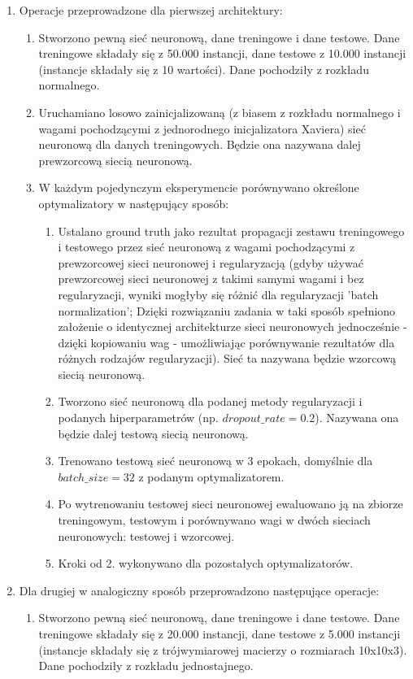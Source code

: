 \documentclass[12pt]{article}
\begin{document}
\begin{enumerate}
	\item Operacje przeprowadzone dla pierwszej architektury:
	\begin{enumerate}
		\item Stworzono pewną sieć neuronową, dane treningowe i dane testowe. Dane treningowe składały się z 50.000 instancji, dane testowe z 10.000 instancji (instancje składały się z 10 wartości). Dane pochodziły z rozkładu normalnego.
		\item Uruchamiano losowo zainicjalizowaną (z biasem z rozkładu normalnego i wagami pochodzącymi z jednorodnego inicjalizatora Xaviera) sieć neuronową dla danych treningowych. Będzie ona nazywana dalej prewzorcową siecią neuronową.
		\item W każdym pojedynczym eksperymencie porównywano określone optymalizatory w następujący sposób:
		\begin{enumerate}
			\item Ustalano ground truth jako rezultat propagacji zestawu treningowego i testowego przez sieć neuronową z wagami pochodzącymi z prewzorcowej sieci neuronowej i regularyzacją (gdyby używać prewzorcowej sieci neuronowej z takimi samymi wagami i bez regularyzacji, wyniki mogłyby się różnić dla regularyzacji 'batch  normalization'; Dzięki rozwiązaniu zadania w taki sposób spełniono założenie o identycznej architekturze sieci neuronowych jednocześnie - dzięki kopiowaniu wag - umożliwiając porównywanie rezultatów dla różnych rodzajów regularyzacji). Sieć ta nazywana będzie wzorcową siecią neuronową.
			\item Tworzono sieć neuronową dla podanej metody regularyzacji i podanych hiperparametrów (np. $dropout\_rate=0.2$). Nazywana ona będzie dalej testową siecią neuronową.
			\item Trenowano testową sieć neuronową w 3 epokach, domyślnie dla $batch\_size=32$ z podanym optymalizatorem.
			\item Po wytrenowaniu testowej sieci neuronowej ewaluowano ją na zbiorze treningowym, testowym i porównywano wagi w dwóch sieciach neuronowych: testowej i wzorcowej.
			\item Kroki od 2. wykonywano dla pozostałych optymalizatorów.	
		\end{enumerate}
	\end{enumerate}
	\item Dla drugiej w analogiczny sposób przeprowadzono następujące operacje:
	\begin{enumerate}
		\item Stworzono pewną sieć neuronową, dane treningowe i dane testowe. Dane treningowe składały się z 20.000 instancji, dane testowe z 5.000 instancji (instancje składały się z trójwymiarowej macierzy o rozmiarach 10x10x3). Dane pochodziły z rozkładu jednostajnego.
		

\end{enumerate}
\end{enumerate}
\end{document}
